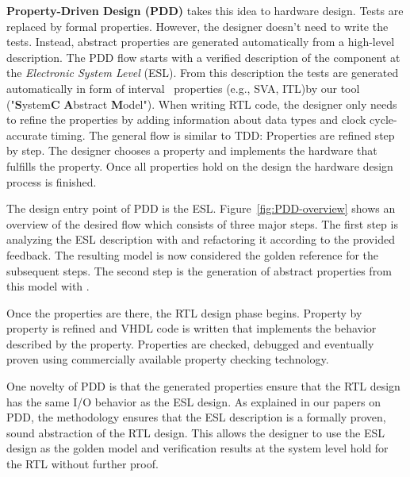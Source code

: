 
\textbf{Property-Driven Design (PDD)} takes this idea to hardware  design. %
Tests are replaced by formal properties. 
However, the designer doesn't need to write the tests. %
Instead, abstract properties are generated automatically from a high-level description. %
The PDD flow starts with a verified description of the component at the \textit{Electronic System Level} (ESL). %
  From this description the tests are generated automatically in form of interval~\cite{2014-UrdahlStoffel.etal} properties (e.g., SVA, ITL)by our tool \DeSCAM{} ("\textbf{S}ystem\textbf{C} \textbf{A}bstract \textbf{M}odel"). %
When writing RTL code, the designer only needs to refine the properties by adding information about data types and clock cycle-accurate timing. %
The general flow is similar to TDD: Properties are refined step by step. 
The designer chooses a property and implements the hardware that fulfills the property. 
Once all properties hold on the design the hardware design process is
finished. %

The design entry point of PDD is the ESL. %
Figure~\ref{fig:PDD-overview} shows an overview of the desired flow
which consists of three major steps. %
The first step is analyzing the ESL description with \DeSCAM{} and
refactoring it according to the provided feedback. %
The resulting model is now considered the golden reference for the
subsequent steps. %
The second step is the generation of abstract properties from this
model with \DeSCAM{}. %
%

Once the properties are there, the RTL design phase begins. %
Property by property is refined and VHDL code is written that
implements the behavior described by the property. %
Properties are checked, debugged and eventually proven using
commercially available property checking technology.

One novelty of PDD is that the generated properties ensure that the
RTL design has the same I/O behavior as the ESL design. %
As explained in our papers on PDD, 
the methodology ensures that the ESL description is a formally proven, sound abstraction of the RTL design. %
This allows the designer to use the ESL design as the golden model and verification results at the system level hold for the RTL without further proof. %


